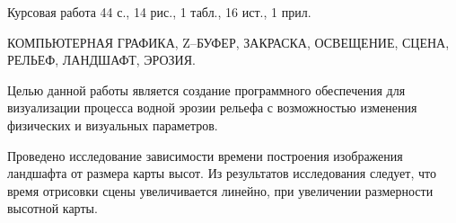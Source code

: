 
Курсовая работа 44 с., 14 рис., 1 табл., 16 ист., 1 прил.

КОМПЬЮТЕРНАЯ ГРАФИКА, Z–БУФЕР, ЗАКРАСКА, ОСВЕЩЕНИЕ, СЦЕНА, РЕЛЬЕФ, ЛАНДШАФТ, ЭРОЗИЯ.

Целью данной работы является создание программного обеспечения для визуализации процесса
водной эрозии рельефа с возможностью изменения
физических и визуальных параметров.

Проведено исследование зависимости времени построения изображения
ландшафта от размера карты высот. Из результатов исследования
следует, что время отрисовки сцены увеличивается линейно, при увеличении размерности высотной карты.
